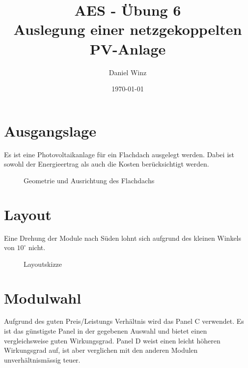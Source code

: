 \documentclass[a4,paper,fleqn]{article}
\title{AES - Übung 6 \\Auslegung einer netzgekoppelten PV-Anlage}
\date{\today}
\author{Daniel Winz}
\begin{document}
\maketitle
\vfill
\tableofcontents
\vfill
\clearpage

\section{Ausgangslage}
Es ist eine Photovoltaikanlage für ein Flachdach ausgelegt werden. Dabei ist 
sowohl der Energieertrag als auch die Kosten berücksichtigt werden. 

\begin{figure}[h!]
    \centering
    \label{fig:roof}
    \caption{Geometrie und Ausrichtung des Flachdachs}
\end{figure}

\clearpage

\section{Layout}
Eine Drehung der Module nach Süden lohnt sich aufgrund des kleinen Winkels von 
$10^\circ$ nicht. 
\begin{figure}[h!]
    \centering
    \label{fig:layout_sketch}
    \caption{Layoutskizze}
\end{figure}

\section{Modulwahl}
Aufgrund des guten Preis/Leistungs Verhältnis wird das Panel C verwendet. Es 
ist das günstigste Panel in der gegebenen Auswahl und bietet einen 
vergleichsweise guten Wirkungsgrad. Panel D weist einen leicht höheren 
Wirkungsgrad auf, ist aber verglichen mit den anderen Modulen 
unverhältnismässig teuer. 
\end{document}
